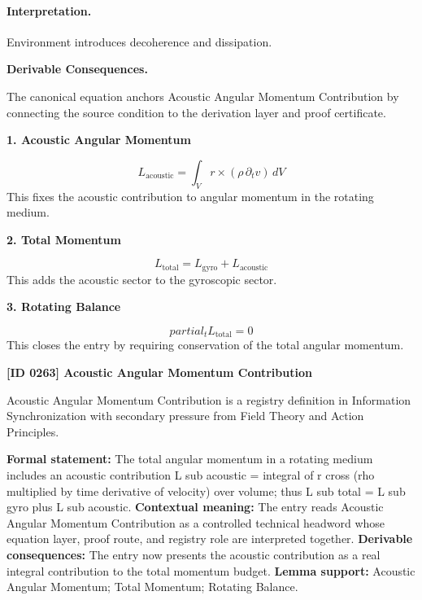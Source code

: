 \paragraph{Interpretation.}
Environment introduces decoherence and dissipation.

\par\vspace{0.35em}
\noindent\textbf{Derivable Consequences.}\quad
\begingroup
\footnotesize
\raggedright
The canonical equation anchors Acoustic Angular Momentum Contribution by connecting the source condition to the derivation layer and proof certificate.
\par\endgroup

\noindent\textbf{1. Acoustic Angular Momentum}\par
\[
L_{\mathrm{acoustic}} = \int_V r \times \left(\rho\,\partial_t v\right)\,dV
\]
\noindent This fixes the acoustic contribution to angular momentum in the rotating medium.\par
\noindent\textbf{2. Total Momentum}\par
\[
L_{\mathrm{total}} = L_{\mathrm{gyro}} + L_{\mathrm{acoustic}}
\]
\noindent This adds the acoustic sector to the gyroscopic sector.\par
\noindent\textbf{3. Rotating Balance}\par
\[
partial_t L_{\mathrm{total}} = 0
\]
\noindent This closes the entry by requiring conservation of the total angular momentum.\par

\clearpage
\noindent\textbf{[ID 0263] Acoustic Angular Momentum Contribution}\par
\vspace{0.35em}
\begingroup\small
{}
Acoustic Angular Momentum Contribution is a registry definition in Information Synchronization with secondary pressure from Field Theory and Action Principles.

\begingroup\footnotesize\setlength{\emergencystretch}{3em}\sloppy
\textbf{Formal statement:} The total angular momentum in a rotating medium includes an acoustic contribution L sub acoustic = integral of r cross (rho multiplied by time derivative of velocity) over volume; thus L sub total = L sub gyro plus L sub acoustic. \textbf{Contextual meaning:} The entry reads Acoustic Angular Momentum Contribution as a controlled technical headword whose equation layer, proof route, and registry role are interpreted together. \textbf{Derivable consequences:} The entry now presents the acoustic contribution as a real integral contribution to the total momentum budget. \textbf{Lemma support:} Acoustic Angular Momentum; Total Momentum; Rotating Balance.\par
\endgroup

